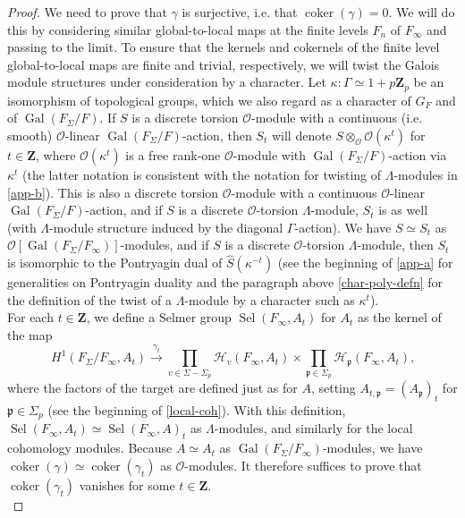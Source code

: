 \documentclass[12 pt]{amsart}
\theoremstyle{plain}
\theoremstyle{definition}
\numberwithin{equation}{section}
\numberwithin{table}{section}
\begin{document}
\begin{proof}
We need to prove that $\gamma$ is surjective, i.e. that $\operatorname{coker}(\gamma)=0$. 
We will do this by considering similar global-to-local maps at the finite levels $F_n$ of $F_\infty$ and passing to the limit. To ensure that the kernels and cokernels of the finite level global-to-local maps are finite and trivial, respectively, we will twist the Galois module structures under consideration by a character. Let $\kappa:\Gamma\simeq 1+p\mathbf{Z}_p$ be an isomorphism of topological groups, which we also regard as a character of $G_F$ and of $\operatorname{Gal}(F_\Sigma/F)$. If $S$ is a discrete torsion $\mathscr{O}$-module with a continuous (i.e. smooth) $\mathscr{O}$-linear $\operatorname{Gal}(F_\Sigma/F)$-action, then $S_t$ will denote $S\otimes_\mathscr{O}\mathscr{O}(\kappa^t)$ for $t\in\mathbf{Z}$, where $\mathscr{O}(\kappa^t)$ is a free rank-one $\mathscr{O}$-module with $\operatorname{Gal}(F_\Sigma/F)$-action via $\kappa^t$ (the latter notation is consistent with the notation for twisting of $\Lambda$-modules in \cref{app-b}). This is also a discrete torsion $\mathscr{O}$-module with a continuous $\mathscr{O}$-linear $\operatorname{Gal}(F_\Sigma/F)$-action, and if $S$ is a discrete $\mathscr{O}$-torsion $\Lambda$-module, $S_t$ is as well (with $\Lambda$-module structure induced by the diagonal $\Gamma$-action). We have $S\simeq S_t$ as $\mathscr{O}[\operatorname{Gal}(F_\Sigma/F_\infty)]$-modules, and if $S$ is a discrete $\mathscr{O}$-torsion $\Lambda$-module, then $S_t$ is isomorphic to the Pontryagin dual of $\widehat{S}(\kappa^{-t})$ (see the beginning of \cref{app-a} for generalities on Pontryagin duality and the paragraph above \cref{char-poly-defn} for the definition of the twist of a $\Lambda$-module by a character such as $\kappa^t$).\\%
\indent For each $t\in\mathbf{Z}$, we define a Selmer group $\operatorname{Sel}(F_\infty,A_t)$ for $A_t$ as the kernel of the map
\begin{equation*}
H^1(F_\Sigma/F_\infty,A_t)\xrightarrow{\gamma_t}\prod_{v\in\Sigma-\Sigma_p}\mathcal{H}_v(F_\infty,A_t)\times\prod_{\mathfrak{p}\in\Sigma_p}\mathcal{H}_\mathfrak{p}
(F_\infty,A_t)\text{,}
\end{equation*}
where the factors of the target are defined just as for $A$, setting $A_{t,\mathfrak{p}}=(A_\mathfrak{p})_t$ for $\mathfrak{p}\in\Sigma_p$ (see the beginning of \cref{local-coh}). With this definition, $\operatorname{Sel}(F_\infty,A_t)\simeq\operatorname{Sel}(F_\infty,A)_t$ as $\Lambda$-modules, and similarly for the local cohomology modules. Because $A\simeq A_t$ as $\operatorname{Gal}(F_\Sigma/F_\infty)$-modules, we have $\operatorname{coker}(\gamma)\simeq\operatorname{coker}(\gamma_t)$ as $\mathscr{O}$-modules. It therefore suffices to prove that $\operatorname{coker}(\gamma_t)$ vanishes for some $t\in\mathbf{Z}$.\\%

\end{proof}
\end{document}
